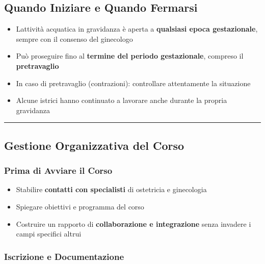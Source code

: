 \documentclass[a4paper,11pt]{article}
\providecommand{\tightlist}{%
  \setlength{\itemsep}{0pt}\setlength{\parskip}{0pt}}
\begin{document}
\subsection{Quando Iniziare e Quando
      Fermarsi}\label{quando-iniziare-e-quando-fermarsi}

\begin{itemize}
      \tightlist
      \item
            L\textquotesingle attività acquatica in gravidanza è aperta a
            \textbf{qualsiasi epoca gestazionale}, sempre con il consenso del
            ginecologo
      \item
            Può proseguire fino al \textbf{termine del periodo gestazionale},
            compreso il \textbf{pretravaglio}
      \item
            In caso di pretravaglio (contrazioni): controllare attentamente la
            situazione
      \item
            Alcune istrici hanno continuato a lavorare anche durante la propria
            gravidanza
\end{itemize}

\begin{center}\rule{0.5\linewidth}{0.5pt}\end{center}

\subsection{Gestione Organizzativa del
      Corso}\label{gestione-organizzativa-del-corso}

\subsubsection{Prima di Avviare il
      Corso}\label{prima-di-avviare-il-corso}

\begin{itemize}
      \tightlist
      \item
            Stabilire \textbf{contatti con specialisti} di ostetricia e
            ginecologia
      \item
            Spiegare obiettivi e programma del corso
      \item
            Costruire un rapporto di \textbf{collaborazione e integrazione} senza
            invadere i campi specifici altrui
\end{itemize}

\subsubsection{Iscrizione e
      Documentazione}\label{iscrizione-e-documentazione}
\end{document}
